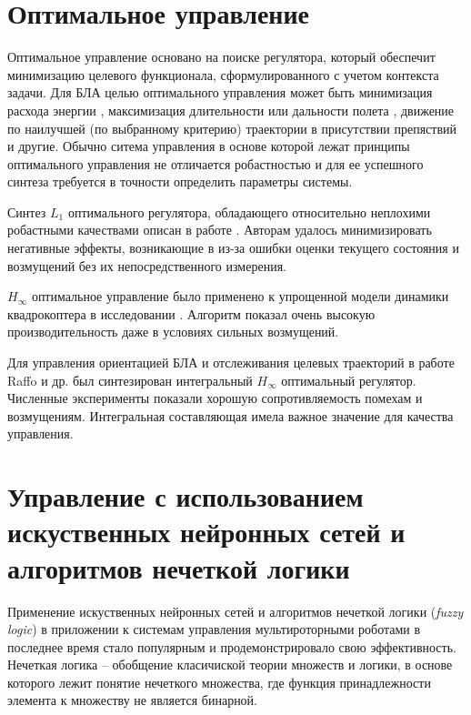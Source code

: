 \section{Оптимальное управление}

Оптимальное управление основано на поиске регулятора, который обеспечит минимизацию целевого функционала, сформулированного с учетом контекста задачи.
Для БЛА целью оптимального управления может быть минимизация расхода энергии \cite{Morbidi01, Huang01}, максимизация длительности или дальности полета \cite{Cowling01, Suicmez01}, движение по наилучшей (по выбранному критерию) траектории в присутствии препяствий \cite{Chen02, Cheng01} и другие.
Обычно ситема управления в основе которой лежат принципы оптимального управления не отличается робастностью и для ее успешного синтеза требуется в точности определить параметры системы.

Синтез $L_1$ оптимального регулятора, обладающего относительно неплохими робастными качествами описан в работе \cite{Satici01}. Авторам удалось минимизировать негативные эффекты, возникающие в из-за ошибки оценки текущего состояния и возмущений без их непосредственного измерения.

$H_{\infty}$ оптимальное управление было применено к упрощенной модели динамики квадрокоптера в исследовании \cite{Falkenberg01}. Алгоритм показал очень высокую производительность даже в условиях сильных возмущений.

Для управления ориентацией БЛА и отслеживания целевых траекторий в работе Raffo и др. \cite{Raffo01} был синтезирован интегральный $H_{\infty}$ оптимальный регулятор. Численные эксперименты показали хорошую сопротивляемость помехам и возмущениям. Интегральная составляющая имела важное значение для качества управления.

\section{Управление с использованием искуственных нейронных сетей и алгоритмов нечеткой логики}

Применение искуственных нейронных сетей и алгоритмов нечеткой логики (\textit{fuzzy logic}) в приложении к системам управления мультироторными роботами в последнее время стало популярным и продемонстрировало свою эффективность. Нечеткая логика  -- обобщение класичиской теории множеств и логики, в основе которого лежит понятие нечеткого множества, где функция принадлежности элемента к множеству не является бинарной.

